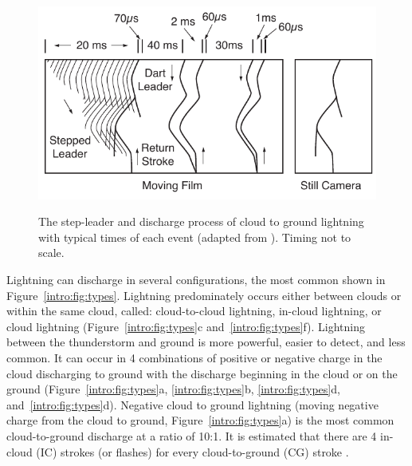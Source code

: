 \begin{figure}[ht!]
	\centering
	\includegraphics[scale=1]{Introduction/Figures/Lightning_Evolution.pdf}\\
	\caption{The step-leader and discharge process of cloud to ground lightning with typical times of each event (adapted from \citet{Uman1969}). Timing not to scale.}
	\label{intro:fig:evolution}
\end{figure}

Lightning can discharge in several configurations, the most common shown in Figure~\ref{intro:fig:types}.
Lightning predominately occurs either between clouds or within the same cloud, called: cloud-to-cloud lightning, in-cloud lightning, or cloud lightning (Figure~\ref{intro:fig:types}c and~\ref{intro:fig:types}f).
Lightning between the thunderstorm and ground is more powerful, easier to detect, and less common.
It can occur in 4 combinations of positive or negative charge in the cloud discharging to ground with the discharge beginning in the cloud or on the ground (Figure~\ref{intro:fig:types}a, \ref{intro:fig:types}b, \ref{intro:fig:types}d, and~\ref{intro:fig:types}d).
Negative cloud to ground lightning (moving negative charge from the cloud to ground, Figure~\ref{intro:fig:types}a) is the most common cloud-to-ground discharge at a ratio of 10:1.
It is estimated that there are 4 in-cloud (IC) strokes (or flashes) for every cloud-to-ground (CG) stroke \citep{Uman1969}.


